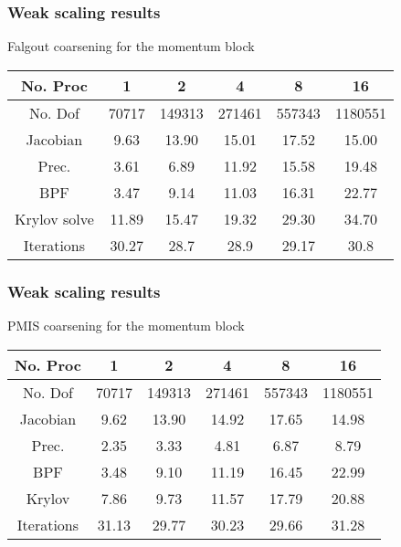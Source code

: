 \documentclass{beamer}
\begin{document}
\begin{frame}\frametitle{Weak scaling results}
Falgout coarsening for the momentum block
\begin{center}
  \begin{tabular}{| c | c | c | c | c | c|}
    \hline
    No. Proc      &    1     &    2  &  4     & 8     & 16  \\ \hline
    No. Dof       & 70717    &149313 &271461  &557343 &1180551 \\ \hline
    Jacobian      & 9.63     &13.90  &15.01   &17.52  &15.00 \\ \hline
    Prec.         &3.61	     &6.89   &11.92   &15.58  &19.48 \\ \hline
    BPF           &3.47      &9.14   &11.03   &16.31  &22.77 \\ \hline
    Krylov solve  &11.89     &15.47  &19.32   &29.30  &34.70 \\ \hline
    Iterations    &30.27     &28.7   &28.9    &29.17  &30.8  \\
    \hline
    \end{tabular}
\end{center}
\end{frame}

\begin{frame}\frametitle{Weak scaling results}
PMIS coarsening for the momentum block
\begin{center}
  \begin{tabular}{| c | c | c | c | c | c|}
    \hline
    No. Proc      &    1     &    2  &  4     & 8     & 16  \\ \hline
    No. Dof       & 70717    &149313 &271461  &557343 &1180551 \\ \hline
    Jacobian      &9.62      &13.90  &14.92   &17.65  &14.98 \\ \hline
    Prec.         &2.35      &3.33   &4.81    &6.87   &8.79 \\ \hline
    BPF           &3.48	     &9.10   &11.19   &16.45  &22.99 \\ \hline
    Krylov        &7.86	     &9.73   &11.57   &17.79  &20.88 \\ \hline
    Iterations    &31.13     &29.77  &30.23   &29.66  &31.28\\
    \hline
    \end{tabular}
\end{center}
\end{frame}
\end{document}
